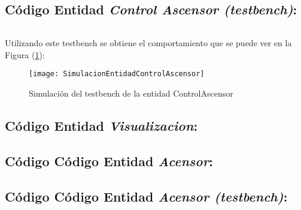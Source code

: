 \subsection{Código Entidad \textit{Control Ascensor (testbench)}:} \label{code:ControlAscensor_tb}
	\inputminted[frame=lines,fontsize=\footnotesize,linenos]{vhdl}{CodeFiles/EntidadControlAscensor_tb.vhd}

    Utilizando este testbench se obtiene el comportamiento que se puede ver en la Figura (\ref{fig:SimulacionEntidadControlAscensor}):

    \begin{figure}[H]
		    \centering
		    \texttt{[image: SimulacionEntidadControlAscensor]}
		    \caption{Simulación del testbench de la entidad ControlAscensor}
		    \label{fig:SimulacionEntidadControlAscensor}
	\end{figure}

\subsection{Código Entidad \textit{Visualizacion}:} \label{code:Visualizacion}

\subsection{Código Código Entidad \textit{Acensor}:} \label{code:Acensor}

\subsection{Código Código Entidad \textit{Acensor (testbench)}:} \label{code:Acensor_tb}
